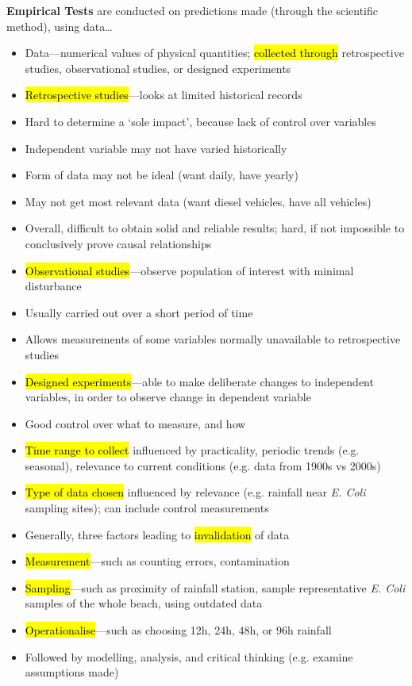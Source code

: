 \documentclass{article}
\newcommand{\headingsmall}[1]{{\small\textbf{#1}}}
\begin{document}
\begin{multicols*}{4}
\headingsmall{Empirical Tests} are conducted on predictions made (through the
scientific method), using data\dots
\begin{itemize} \itemsep -0.5em
    \item Data---numerical values of physical quantities; \hl{collected through}
         retrospective studies, observational studies, or designed experiments
    \item \hl{Retrospective studies}---looks at limited historical records
    \item Hard to determine a `sole impact', because lack of control over variables
    \item Independent variable may not have varied historically
    \item Form of data may not be ideal (want daily, have yearly)
    \item May not get most relevant data (want diesel vehicles, have all vehicles)
    \item Overall, difficult to obtain solid and reliable results; hard, if not impossible
        to conclusively prove causal relationships
    \item \hl{Observational studies}---observe population of interest with minimal 
        disturbance
    \item Usually carried out over a short period of time
    \item Allows measurements of some variables normally unavailable to retrospective studies
    \item \hl{Designed experiments}---able to make deliberate changes to independent
        variables, in order to observe change in dependent variable
    \item Good control over what to measure, and how
    \item \hl{Time range to collect} influenced by practicality, periodic trends 
        (e.g. seasonal), relevance to current conditions (e.g. data from 1900s vs 2000s)
    \item \hl{Type of data chosen} influenced by relevance (e.g. rainfall near 
        \textit{E. Coli} sampling sites); can include control measurements
    \item Generally, three factors leading to \hl{invalidation} of data
    \item \hl{Measurement}---such as counting errors, contamination
    \item \hl{Sampling}---such as proximity of rainfall station, sample representative 
        \textit{E. Coli} samples of the whole beach, using outdated data
    \item \hl{Operationalise}---such as choosing 12h, 24h, 48h, or 96h rainfall
    \item Followed by modelling, analysis, and critical thinking (e.g. examine assumptions
        made)
\end{itemize}


\end{multicols*}
\end{document}
